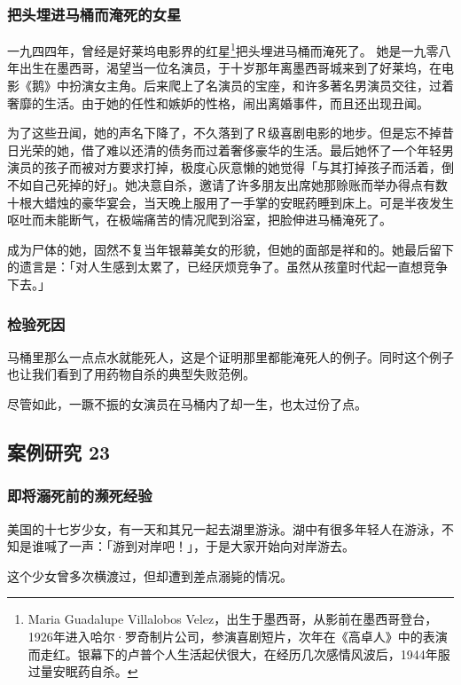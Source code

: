 \documentclass[UTF8]{ctexart}
\begin{document}
\subsubsection*{把头埋进马桶而淹死的女星}

一九四四年，曾经是好莱坞电影界的红星\footnote{Maria Guadalupe Villalobos Velez，出生于墨西哥，从影前在墨西哥登台，1926年进入哈尔·罗奇制片公司，参演喜剧短片，次年在《高卓人》中的表演而走红。银幕下的卢普个人生活起伏很大，在经历几次感情风波后，1944年服过量安眠药自杀。}把头埋进马桶而淹死了。
她是一九零八年出生在墨西哥，渴望当一位名演员，于十岁那年离墨西哥城来到了好莱坞，在电影《鹅》中扮演女主角。后来爬上了名演员的宝座，和许多著名男演员交往，过着奢靡的生活。由于她的任性和嫉妒的性格，闹出离婚事件，而且还出现丑闻。

为了这些丑闻，她的声名下降了，不久落到了Ｒ级喜剧电影的地步。但是忘不掉昔日光荣的她，借了难以还清的债务而过着奢侈豪华的生活。最后她怀了一个年轻男演员的孩子而被对方要求打掉，极度心灰意懒的她觉得「与其打掉孩子而活着，倒不如自己死掉的好」。她决意自杀，邀请了许多朋友出席她那赊账而举办得点有数十根大蜡烛的豪华宴会，当天晚上服用了一手掌的安眠药睡到床上。可是半夜发生呕吐而未能断气，在极端痛苦的情况爬到浴室，把脸伸进马桶淹死了。

成为尸体的她，固然不复当年银幕美女的形貌，但她的面部是祥和的。她最后留下的遗言是：「对人生感到太累了，已经厌烦竞争了。虽然从孩童时代起一直想竞争下去。」


\subsubsection*{检验死因}

马桶里那么一点点水就能死人，这是个证明那里都能淹死人的例子。同时这个例子也让我们看到了用药物自杀的典型失败范例。 

尽管如此，一蹶不振的女演员在马桶内了却一生，也太过份了点。

\subsection{案例研究 23}

\subsubsection*{即将溺死前的濒死经验}

美国的十七岁少女，有一天和其兄一起去湖里游泳。湖中有很多年轻人在游泳，不知是谁喊了一声：「游到对岸吧！」，于是大家开始向对岸游去。

这个少女曾多次横渡过，但却遭到差点溺毙的情况。
\end{document}
